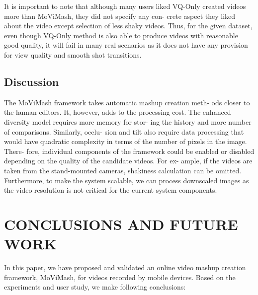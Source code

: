 \documentclass{sig-alternate}
\begin{document}
It is important to note that although many users liked VQ-Only
created videos more than MoViMash, they did not specify any con-
crete aspect they liked about the video except selection of less
shaky videos. Thus, for the given dataset, even though VQ-Only
method is also able to produce videos with reasonable good quality,
it will fail in many real scenarios as it does not have any provision
for view quality and smooth shot transitions.

\subsection{Discussion}
The MoViMash framework takes automatic mashup creation meth-
ods closer to the human editors. It, however, adds to the processing
cost. The enhanced diversity model requires more memory for stor-
ing the history and more number of comparisons. Similarly, occlu-
sion and tilt also require data processing that would have quadratic
complexity in terms of the number of pixels in the image. There-
fore, individual components of the framework could be enabled or
disabled depending on the quality of the candidate videos. For ex-
ample, if the videos are taken from the stand-mounted cameras,
shakiness calculation can be omitted. Furthermore, to make the
system scalable, we can process downscaled images as the video
resolution is not critical for the current system components.

\section{CONCLUSIONS AND FUTURE WORK}
In this paper, we have proposed and validated an online video
mashup creation framework, MoViMash, for videos recorded by
mobile devices. Based on the experiments and user study, we make
following conclusions:
\end{document}
